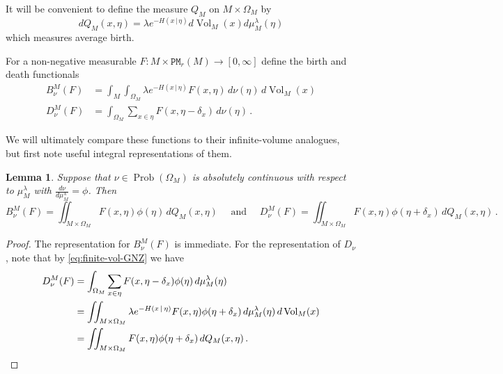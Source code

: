 \documentclass[11pt]{amsart}
\newtheorem{lemma}[theorem]{Lemma}
\theoremstyle{definition}
\theoremstyle{remark}
\newcommand{\cP}{\mathtt{PM}}
\newcommand{\Prob}{\operatorname{Prob}}
\newcommand{\Vol}{\operatorname{Vol}}
\begin{document}
It will be convenient to define the measure $Q_M$ on $M \times \Omega_M$ by \begin{equation}
    dQ_M(x,\eta) = \lambda e^{-H(x\,|\,\eta)} d\Vol_M(x) d\mu_M^{\lambda}(\eta)
\end{equation}
which measures average birth.  



For a non-negative measurable $F: M \times \cP_r(M) \to [0,\infty]$ define the birth and death functionals 
\begin{align*}
    B_\nu^M(F) &= \int_M \int_{\Omega_M} \lambda e^{-H(x\,|\,\eta)} F(x,\eta) \,d\nu(\eta)\,d\Vol_M(x)\\
    D_\nu^M(F) &= \int_{\Omega_M} \sum_{x \in \eta} F(x,\eta - \delta_x) \,d\nu(\eta)\,.
\end{align*}

We will ultimately compare these functions to their infinite-volume analogues, but first note useful integral representations of them.
\begin{lemma}\label{lem:birth-death-identities}
    Suppose that $\nu \in \Prob(\Omega_M)$ is absolutely continuous with respect to $\mu_M^{\lambda}$ with $\frac{d\nu}{d\mu_M^{\lambda}} = \phi$.  Then \begin{equation*}
        B_\nu^M(F) = \iint_{M\times \Omega_M}  F(x,\eta) \phi(\eta) \,dQ_M(x,\eta)\quad \text{ and }\quad D_\nu^M(F) = \iint_{M\times \Omega_M} F(x,\eta) \phi(\eta + \delta_x) \,dQ_M(x,\eta)\,.
    \end{equation*}
\end{lemma}
\begin{proof}
    The representation for $B_\nu^M(F)$ is immediate. For the representation of $D_\nu$, note that by \eqref{eq:finite-vol-GNZ} we have \begin{align*}
        D_\nu^M(F) &= \int_{\Omega_M} \sum_{x \in \eta} F(x,\eta - \delta_x)  \phi(\eta) \,d\mu_M^\lambda(\eta) \\
        &= \iint_{M\times \Omega_M}\lambda  e^{-H(x\,|\,\eta)} F(x,\eta) \phi(\eta + \delta_x)  \,d\mu_M^\lambda(\eta) \,d\Vol_M(x) \\
        &= \iint_{M\times \Omega_M} F(x,\eta) \phi(\eta + \delta_x) \,dQ_M(x,\eta)\,. \qedhere
    \end{align*}
\end{proof}
   
\end{document}
